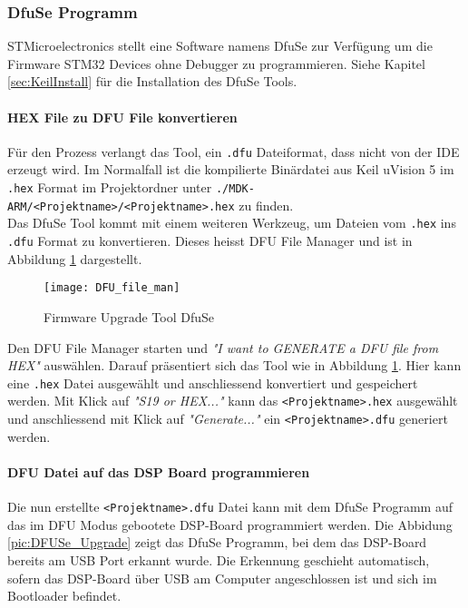 \subsubsection{DfuSe Programm}
\label{sec:DFUSe}

STMicroelectronics stellt eine Software namens DfuSe zur Verfügung um die Firmware STM32 Devices ohne Debugger zu programmieren. Siehe Kapitel \ref{sec:KeilInstall} für die Installation des DfuSe Tools.

\paragraph{HEX File zu DFU File konvertieren}

Für den Prozess verlangt das Tool, ein \texttt{.dfu} Dateiformat, dass nicht von der IDE erzeugt wird. 
Im Normalfall ist die kompilierte Binärdatei aus Keil uVision 5 im \texttt{.hex} Format im Projektordner unter \texttt{./MDK-ARM/<Projektname>/<Projektname>.hex} zu finden.\\

Das DfuSe Tool kommt mit einem weiteren Werkzeug, um Dateien vom \texttt{.hex} ins \texttt{.dfu} Format zu konvertieren. 
Dieses heisst DFU File Manager und ist in Abbildung \ref{pic:DFU_file_man} dargestellt.

\begin{figure}[H]
	\centering
	\texttt{[image: DFU\_file\_man]}
	\caption{Firmware Upgrade Tool DfuSe}
	\label{pic:DFU_file_man}
\end{figure}

Den DFU File Manager starten und \textit{"I want to GENERATE a DFU file from HEX"} auswählen.
Darauf präsentiert sich das Tool wie in Abbildung \ref{pic:DFU_file_man}. Hier kann eine \texttt{.hex} Datei ausgewählt und anschliessend konvertiert und gespeichert werden.
Mit Klick auf \textit{"S19 or HEX..."} kann das \texttt{<Projektname>.hex} ausgewählt und anschliessend mit Klick auf \textit{"Generate..."} ein \texttt{<Projektname>.dfu} generiert werden.

\paragraph{DFU Datei auf das DSP Board programmieren}

Die nun erstellte \texttt{<Projektname>.dfu} Datei kann mit dem DfuSe Programm auf das im DFU Modus gebootete DSP-Board programmiert werden. 
Die Abbidung \ref{pic:DFUSe_Upgrade} zeigt das DfuSe Programm, bei dem das DSP-Board bereits am USB Port erkannt wurde. Die Erkennung geschieht automatisch, sofern das DSP-Board über USB am Computer angeschlossen ist und sich im Bootloader befindet.

